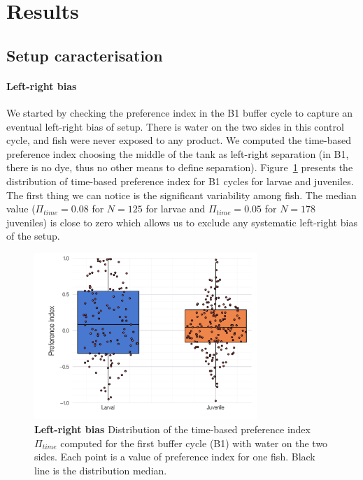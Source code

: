   \section{Results}
  \subsection{Setup caracterisation}
  \paragraph{Left-right bias} We started by checking the preference index in the B1 buffer cycle to capture an eventual left-right bias of setup. There is water on the two sides in this control cycle, and fish were never exposed to any product. We computed the time-based preference index choosing the middle of the tank as left-right separation (in B1, there is no dye, thus no other means to define separation). Figure~\ref{ld_bias} presents the distribution of time-based preference index for B1 cycles for larvae and juveniles. The first thing we can notice is the significant variability among fish. The median value ($\Pi_{time} = 0.08$ for $N=125$ for larvae and $\Pi_{time} = 0.05$ for $N = 178$ juveniles) is close to zero which allows us to exclude any systematic left-right bias of the setup.

    \begin{figure}[htb]
      \centering
      \includegraphics[width=0.75\textwidth]{part_2/assets/ld_bias.png}
      \caption{\textbf{Left-right bias} Distribution of the time-based preference index $\Pi_{time}$ computed for the first buffer cycle (B1) with water on the two sides. Each point is a value of preference index for one fish. Black line is the distribution median.}
      \label{ld_bias}
    \end{figure}

